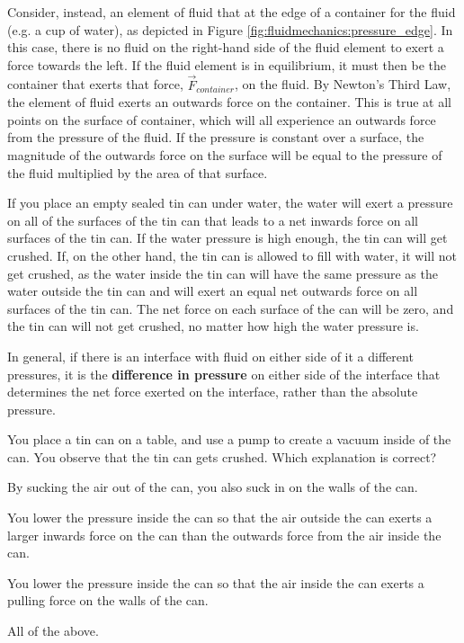 Consider, instead, an element of fluid that at the edge of a container for the fluid (e.g. a cup of water), as depicted in Figure \ref{fig:fluidmechanics:pressure_edge}.
In this case, there is no fluid on the right-hand side of the fluid element to exert a force towards the left. If the fluid element is in equilibrium, it must then be the container that exerts that force, $\vec F_{container}$, on the fluid. By Newton's Third Law, the element of fluid exerts an outwards force on the container. This is true at all points on the surface of container, which will all experience an outwards force from the pressure of the fluid. If the pressure is constant over a surface, the magnitude of the outwards force on the surface will be equal to the pressure of the fluid multiplied by the area of that surface. 

If you place an empty sealed tin can under water, the water will exert a pressure on all of the surfaces of the tin can that leads to a net inwards force on all surfaces of the tin can. If the water pressure is high enough, the tin can will get crushed. If, on the other hand, the tin can is allowed to fill with water, it will not get crushed, as the water inside the tin can will have the same pressure as the water outside the tin can and will exert an equal net outwards force on all surfaces of the tin can. The net force on each surface of the can will be zero, and the tin can will not get crushed, no matter how high the water pressure is. 

In general, if there is an interface with fluid on either side of it a different pressures, it is the \textbf{difference in pressure} on either side of the interface that determines the net force exerted on the interface, rather than the absolute pressure.

\begin{checkpoint}
\begin{MCquestion}{You place a tin can on a table, and use a pump to create a vacuum inside of the can. You observe that the tin can gets crushed. Which explanation is correct?}
\item By sucking the air out of the can, you also suck in on the walls of the can. 
\item You lower the pressure inside the can so that the air outside the can exerts a larger inwards force on the can than the outwards force from the air inside the can. \correct
\item You lower the pressure inside the can so that the air inside the can exerts a pulling force on the walls of the can.
\item All of the above. 
\end{MCquestion}
\end{checkpoint}

